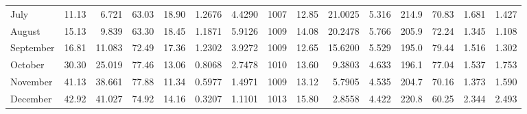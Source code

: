 \begin{landscape}
\begin{table}[H]
\begin{tabular}{llrrrrrrrrrrrrr}
July & 11.13 & 6.721 & 63.03 & 18.90 & 1.2676 & 4.4290 & 1007 & 12.85 & 21.0025 & 5.316 & 214.9 & 70.83 & 1.681 & 1.427 \\
August & 15.13 & 9.839 & 63.30 & 18.45 & 1.1871 & 5.9126 & 1009 & 14.08 & 20.2478 & 5.766 & 205.9 & 72.24 & 1.345 & 1.108 \\
September & 16.81 & 11.083 & 72.49 & 17.36 & 1.2302 & 3.9272 & 1009 & 12.65 & 15.6200 & 5.529 & 195.0 & 79.44 & 1.516 & 1.302 \\
October & 30.30 & 25.019 & 77.46 & 13.06 & 0.8068 & 2.7478 & 1010 & 13.60 & 9.3803 & 4.633 & 196.1 & 77.04 & 1.537 & 1.753 \\
November & 41.13 & 38.661 & 77.88 & 11.34 & 0.5977 & 1.4971 & 1009 & 13.12 & 5.7905 & 4.535 & 204.7 & 70.16 & 1.373 & 1.590 \\
December & 42.92 & 41.027 & 74.92 & 14.16 & 0.3207 & 1.1101 & 1013 & 15.80 & 2.8558 & 4.422 & 220.8 & 60.25 & 2.344 & 2.493 \\ \hline
\end{tabular}
\end{table}
\end{landscape}

